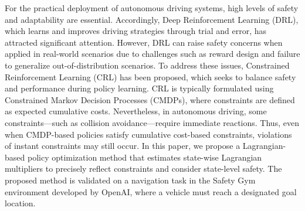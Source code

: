 
For the practical deployment of autonomous driving systems, high levels of safety and adaptability are essential.
Accordingly, Deep Reinforcement Learning (DRL), which learns and improves driving strategies through trial and error, has attracted significant attention.
However, DRL can raise safety concerns when applied in real-world scenarios due to challenges such as reward design and failure to generalize out-of-distribution scenarios.
To address these issues, Constrained Reinforcement Learning (CRL) has been proposed, which seeks to balance safety and performance during policy learning.
CRL is typically formulated using Constrained Markov Decision Processes (CMDPs), where constraints are defined as expected cumulative costs.
Nevertheless, in autonomous driving, some constraints---such as collision avoidance---require immediate reactions.
Thus, even when CMDP-based policies satisfy cumulative cost-based constraints, violations of instant constraints may still occur.
In this paper, we propose a Lagrangian-based policy optimization method that estimates state-wise Lagrangian multipliers to precisely reflect constraints and consider state-level safety.
The proposed method is validated on a navigation task in the Safety Gym environment developed by OpenAI, where a vehicle must reach a designated goal location.